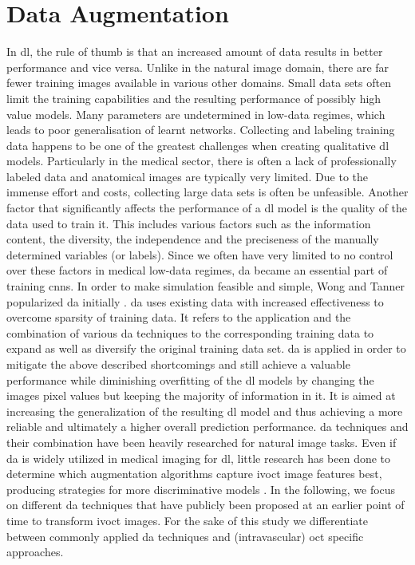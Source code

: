 \section{Data Augmentation}
In \acrshort{dl}, the rule of thumb is that an increased amount of data results in better performance and vice versa. Unlike in the natural image domain, there are far fewer training images available in various other domains. Small data sets often limit the training capabilities and the resulting performance of possibly high value models. Many parameters are undetermined in low-data regimes, which leads to poor generalisation of learnt networks. Collecting and labeling training data happens to be one of the greatest challenges when creating qualitative \acrshort{dl} models. Particularly in the medical sector, there is often a lack of professionally labeled data and anatomical images are typically very limited. Due to the immense effort and costs, collecting large data sets is often be unfeasible. Another factor that significantly affects the performance of a \acrshort{dl} model is the quality of the data used to train it. This includes various factors such as the information content, the diversity, the independence and the preciseness of the manually determined variables (or labels). Since we often have very limited to no control over these factors in medical low-data regimes, \acrshort{da} became an essential part of training \acrshort{cnn}s. In order to make simulation feasible and simple, Wong and Tanner popularized \acrshort{da} initially \cite{MartinA.Tanner.1987}. \acrshort{da} uses existing data with increased effectiveness to overcome sparsity of training data. It refers to the application and the combination of various \acrshort{da} techniques to the corresponding training data to expand as well as diversify the original training data set. \Acrshort{da} is applied in order to mitigate the above described shortcomings and still achieve a valuable performance while diminishing \gls{overfitting} of the \acrshort{dl} models by changing the images pixel values but keeping the majority of information in it. It is aimed at increasing the generalization of the resulting \acrshort{dl} model and thus achieving a more reliable and ultimately a higher overall prediction performance. \Acrshort{da} techniques and their combination have been heavily researched for natural image tasks. Even if \acrshort{da} is widely utilized in medical imaging for \acrshort{dl}, little research has been done to determine which augmentation algorithms capture \acrshort{ivoct} image features best, producing strategies for more discriminative models \cite{hussain.2018}. In the following, we focus on different \acrshort{da} techniques that have publicly been proposed at an earlier point of time to transform \acrshort{ivoct} images. For the sake of this study we differentiate between commonly applied \acrshort{da} techniques and (intravascular) \acrshort{oct} specific approaches.

